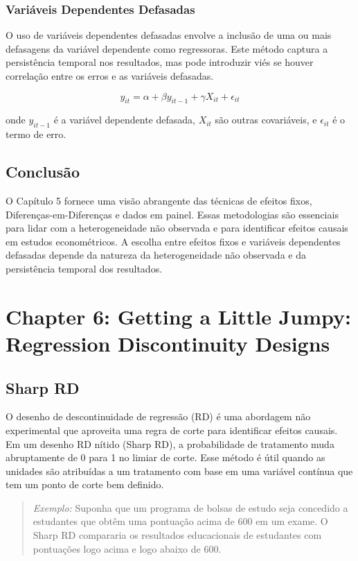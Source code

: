 \documentclass[a4paper,12pt]{article}[abntex2]
\begin{document}
\subsubsection{Variáveis Dependentes Defasadas}
O uso de variáveis dependentes defasadas envolve a inclusão de uma ou mais defasagens da variável dependente como regressoras. Este método captura a persistência temporal nos resultados, mas pode introduzir viés se houver correlação entre os erros e as variáveis defasadas.

\begin{equation}
y_{it} = \alpha + \beta y_{it-1} + \gamma X_{it} + \epsilon_{it}
\end{equation}

onde \( y_{it-1} \) é a variável dependente defasada, \( X_{it} \) são outras covariáveis, e \( \epsilon_{it} \) é o termo de erro.

\subsection{Conclusão}
O Capítulo 5 fornece uma visão abrangente das técnicas de efeitos fixos, Diferenças-em-Diferenças e dados em painel. Essas metodologias são essenciais para lidar com a heterogeneidade não observada e para identificar efeitos causais em estudos econométricos. A escolha entre efeitos fixos e variáveis dependentes defasadas depende da natureza da heterogeneidade não observada e da persistência temporal dos resultados.

\newpage

\section{Chapter 6: Getting a Little Jumpy: Regression Discontinuity Designs}

\subsection{Sharp RD}
O desenho de descontinuidade de regressão (RD) é uma abordagem não experimental que aproveita uma regra de corte para identificar efeitos causais. Em um desenho RD nítido (Sharp RD), a probabilidade de tratamento muda abruptamente de 0 para 1 no limiar de corte. Esse método é útil quando as unidades são atribuídas a um tratamento com base em uma variável contínua que tem um ponto de corte bem definido.

\begin{quote}
\textit{Exemplo:} Suponha que um programa de bolsas de estudo seja concedido a estudantes que obtêm uma pontuação acima de 600 em um exame. O Sharp RD compararia os resultados educacionais de estudantes com pontuações logo acima e logo abaixo de 600.
\end{quote}
\end{document}
